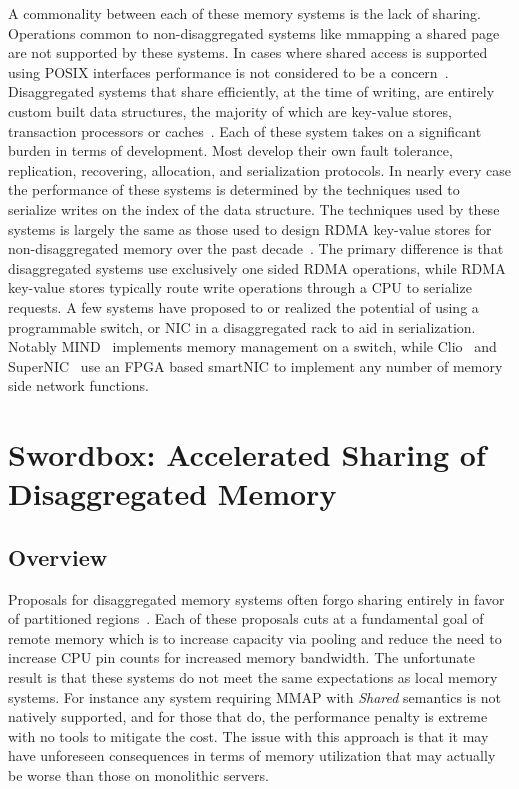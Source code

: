\documentclass[12pt]{ucsddissertation}
\begin{document}
A commonality between each of these memory systems is the lack of sharing. Operations common to
non-disaggregated systems like mmapping a shared page are not supported by these systems. In cases
where shared access is supported using POSIX interfaces performance is not considered to be a
concern~\cite{Regions}. Disaggregated systems that share efficiently, at the time of writing, are
entirely custom built data structures, the majority of which are key-value stores, transaction
processors or caches~\cite{clover, sherman, race, fusee, rolex, ford, ditto}. Each of these system
takes on a significant burden in terms of development. Most develop their own fault tolerance,
replication, recovering, allocation, and serialization protocols. In nearly every case the
performance of these systems is determined by the techniques used to serialize writes on the index
of the data structure.
The techniques used by these systems is largely the same as those used to design RDMA key-value
stores for non-disaggregated memory over the past decade~\cite{pilaf,cell,herd,farm}. The primary
difference is that disaggregated systems use exclusively one sided RDMA operations, while RDMA
key-value stores typically route write operations through a CPU to serialize requests.
A few systems have proposed to or realized the potential of using a programmable switch, or NIC in a
disaggregated rack to aid in serialization. Notably MIND~\cite{mind} implements memory management on
a switch, while Clio~\cite{clio} and SuperNIC~\cite{supernic} use an FPGA based smartNIC to
implement any number of memory side network functions.





\chapter{Swordbox: Accelerated Sharing of Disaggregated Memory}
\label{chap:swordbox}

\section{Overview}

Proposals for disaggregated memory systems often forgo sharing entirely in favor of partitioned
regions~\cite{infiniswap,fastswap,leap,legoos,blade}. Each of these proposals cuts at a fundamental
goal of remote memory which is to increase capacity via pooling and reduce the need to increase CPU
pin counts for increased memory bandwidth. The unfortunate result is that these systems do not meet
the same expectations as local memory systems. For instance any system requiring MMAP with
\textit{Shared} semantics is not natively supported, and for those that do, the performance penalty
is extreme with no tools to mitigate the cost. The issue with this approach is that it may have
unforeseen consequences in terms of memory utilization that may actually be worse than those on
monolithic servers. 
\end{document}
